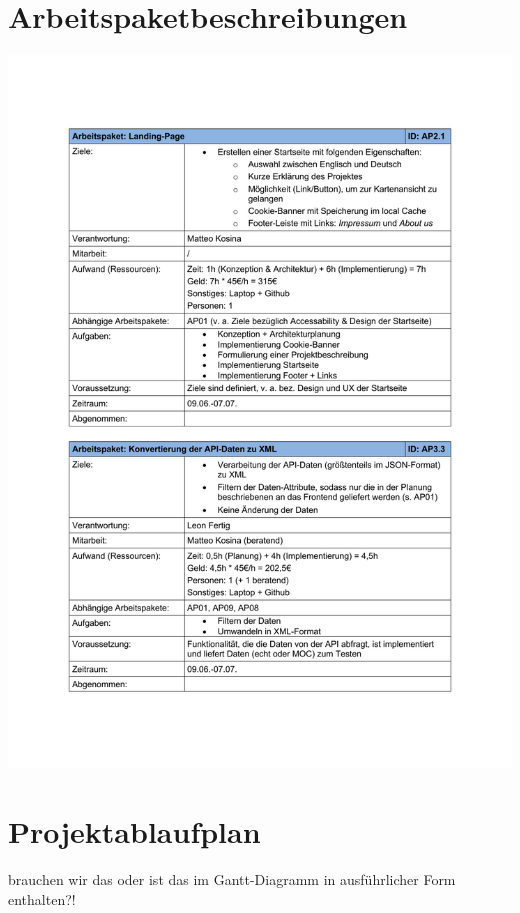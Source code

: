 \documentclass[12pt]{article}
\begin{document}
\section{Arbeitspaketbeschreibungen}
\includegraphics[width=\textwidth]{Planungsdokumente/graphics/Arbeitspakete.pdf}

\section{Projektablaufplan}
{\color{red} brauchen wir das oder ist das im Gantt-Diagramm in ausführlicher Form enthalten?!}
\end{document}
